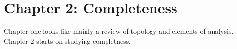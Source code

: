 \newpage 
\section{Chapter 2: Completeness}

Chapter one looks like mainly a review of topology and elements of analysis. Chapter 2 starts on studying completness. 